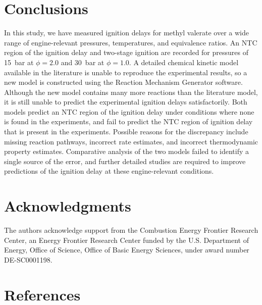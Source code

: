 \documentclass[letterpaper, review, sort&compress]{elsarticle}
\begin{document}
\section{Conclusions}\label{sec:conclusions}

In this study, we have measured ignition delays for methyl valerate over a wide range of
engine-relevant pressures, temperatures, and equivalence ratios. An NTC region of the ignition delay
and two-stage ignition are recorded for pressures of \SI{15}{\bar} at \(\phi=2.0\) and \SI{30}{\bar}
at \(\phi=1.0\). A detailed chemical kinetic model available in the literature is unable to
reproduce the experimental results, so a new model is constructed using the Reaction Mechanism
Generator software. Although the new model contains many more reactions than the literature model,
it is still unable to predict the experimental ignition delays satisfactorily. Both models predict
an NTC region of the ignition delay under conditions where none is found in the experiments, and
fail to predict the NTC region of ignition delay that is present in the experiments. Possible
reasons for the discrepancy include missing reaction pathways, incorrect rate estimates, and
incorrect thermodynamic property estimates. Comparative analysis of the two models failed to
identify a single source of the error, and further detailed studies are required to improve
predictions of the ignition delay at these engine-relevant conditions.

\section{Acknowledgments}\label{sec:acknowledgments}

The authors acknowledge support from the Combustion Energy Frontier Research Center, an Energy
Frontier Research Center funded by the U.S. Department of Energy, Office of Science, Office of Basic
Energy Sciences, under award number DE-SC0001198.

\section*{References}

\end{document}
